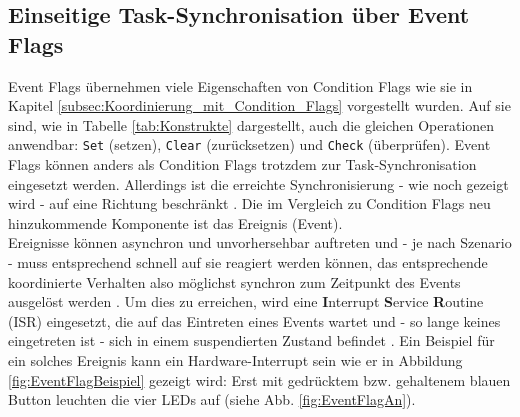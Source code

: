 \documentclass{llncs}
\begin{document}
\subsection{Einseitige Task-Synchronisation über Event Flags}
\label{subsec:Task-Synchronisation_Event_Flags}
Event Flags übernehmen viele Eigenschaften von Condition Flags wie sie in Kapitel \ref{subsec:Koordinierung_mit_Condition_Flags} vorgestellt wurden. Auf sie sind, wie in Tabelle \ref{tab:Konstrukte} dargestellt, auch die gleichen Operationen anwendbar: \texttt{Set} (setzen), \texttt{Clear} (zurücksetzen) und \texttt{Check} (überprüfen). Event Flags können anders als Condition Flags trotzdem zur Task-Synchronisation eingesetzt werden. Allerdings ist die erreichte Synchronisierung - wie noch gezeigt wird - auf eine Richtung beschränkt \autocite[vgl.][87]{Cooling2017}. Die im Vergleich zu Condition Flags neu hinzukommende Komponente ist das Ereignis (Event).\\

Ereignisse können asynchron und unvorhersehbar auftreten und - je nach Szenario - muss entsprechend schnell auf sie reagiert werden können, das entsprechende koordinierte Verhalten also möglichst synchron zum Zeitpunkt des Events ausgelöst werden \autocite{MikrocontrollerInterrupt}. Um dies zu erreichen, wird eine \textbf{I}nterrupt \textbf{S}ervice \textbf{R}outine (ISR) eingesetzt, die auf das Eintreten eines Events wartet und - so lange keines eingetreten ist - sich in einem suspendierten Zustand befindet \autocite[vgl.][87]{Cooling2017}. Ein Beispiel für ein solches Ereignis kann ein Hardware-Interrupt sein wie er in Abbildung \ref{fig:EventFlagBeispiel} gezeigt wird: Erst mit gedrücktem bzw. gehaltenem blauen Button leuchten die vier LEDs auf (siehe Abb. \ref{fig:EventFlagAn}).\\
\end{document}

